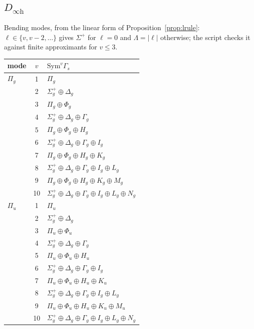 \documentclass[11pt]{article}
\begin{document}
\subsection*{$D_{\infty\mathrm h}$}
Bending modes, from the linear form of Proposition~\ref{prop:lrule}: $\ell\in\{v,v-2,\ldots\}$ gives $\Sigma^+$ for $\ell=0$ and $\Lambda=|\ell|$ otherwise; the script checks it against finite approximants for $v\le3$.
\begin{longtable}{l c p{}}
\hline mode & $v$ & $\mathrm{Sym}^v\Gamma_s$\\ \hline\endhead
$\Pi_{g}$ & 1 & $\Pi_{g}$\\
 & 2 & $\Sigma^{+}_{g}\oplus \Delta_{g}$\\
 & 3 & $\Pi_{g}\oplus \Phi_{g}$\\
 & 4 & $\Sigma^{+}_{g}\oplus \Delta_{g}\oplus \Gamma_{g}$\\
 & 5 & $\Pi_{g}\oplus \Phi_{g}\oplus H_{g}$\\
 & 6 & $\Sigma^{+}_{g}\oplus \Delta_{g}\oplus \Gamma_{g}\oplus I_{g}$\\
 & 7 & $\Pi_{g}\oplus \Phi_{g}\oplus H_{g}\oplus K_{g}$\\
 & 8 & $\Sigma^{+}_{g}\oplus \Delta_{g}\oplus \Gamma_{g}\oplus I_{g}\oplus L_{g}$\\
 & 9 & $\Pi_{g}\oplus \Phi_{g}\oplus H_{g}\oplus K_{g}\oplus M_{g}$\\
 & 10 & $\Sigma^{+}_{g}\oplus \Delta_{g}\oplus \Gamma_{g}\oplus I_{g}\oplus L_{g}\oplus N_{g}$\\
\hline
$\Pi_{u}$ & 1 & $\Pi_{u}$\\
 & 2 & $\Sigma^{+}_{g}\oplus \Delta_{g}$\\
 & 3 & $\Pi_{u}\oplus \Phi_{u}$\\
 & 4 & $\Sigma^{+}_{g}\oplus \Delta_{g}\oplus \Gamma_{g}$\\
 & 5 & $\Pi_{u}\oplus \Phi_{u}\oplus H_{u}$\\
 & 6 & $\Sigma^{+}_{g}\oplus \Delta_{g}\oplus \Gamma_{g}\oplus I_{g}$\\
 & 7 & $\Pi_{u}\oplus \Phi_{u}\oplus H_{u}\oplus K_{u}$\\
 & 8 & $\Sigma^{+}_{g}\oplus \Delta_{g}\oplus \Gamma_{g}\oplus I_{g}\oplus L_{g}$\\
 & 9 & $\Pi_{u}\oplus \Phi_{u}\oplus H_{u}\oplus K_{u}\oplus M_{u}$\\
 & 10 & $\Sigma^{+}_{g}\oplus \Delta_{g}\oplus \Gamma_{g}\oplus I_{g}\oplus L_{g}\oplus N_{g}$\\
\hline
\end{longtable}
\end{document}
